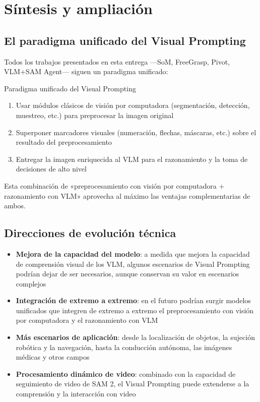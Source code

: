 \section{Síntesis y ampliación}

\subsection{El paradigma unificado del Visual Prompting}

Todos los trabajos presentados en esta entrega —SoM, FreeGrasp, Pivot, VLM+SAM Agent— siguen un paradigma unificado:

\begin{importantbox}{Paradigma unificado del Visual Prompting}
\begin{enumerate}
    \item Usar módulos clásicos de visión por computadora (segmentación, detección, muestreo, etc.) para preprocesar la imagen original
    \item Superponer marcadores visuales (numeración, flechas, máscaras, etc.) sobre el resultado del preprocesamiento
    \item Entregar la imagen enriquecida al VLM para el razonamiento y la toma de decisiones de alto nivel
\end{enumerate}
Esta combinación de «preprocesamiento con visión por computadora + razonamiento con VLM» aprovecha al máximo las ventajas complementarias de ambos.
\end{importantbox}

\subsection{Direcciones de evolución técnica}

\begin{itemize}
    \item \textbf{Mejora de la capacidad del modelo}: a medida que mejora la capacidad de comprensión visual de los VLM, algunos escenarios de Visual Prompting podrían dejar de ser necesarios, aunque conservan su valor en escenarios complejos
    \item \textbf{Integración de extremo a extremo}: en el futuro podrían surgir modelos unificados que integren de extremo a extremo el preprocesamiento con visión por computadora y el razonamiento con VLM
    \item \textbf{Más escenarios de aplicación}: desde la localización de objetos, la sujeción robótica y la navegación, hasta la conducción autónoma, las imágenes médicas y otros campos
    \item \textbf{Procesamiento dinámico de video}: combinado con la capacidad de seguimiento de video de SAM 2, el Visual Prompting puede extenderse a la comprensión y la interacción con video
\end{itemize}

